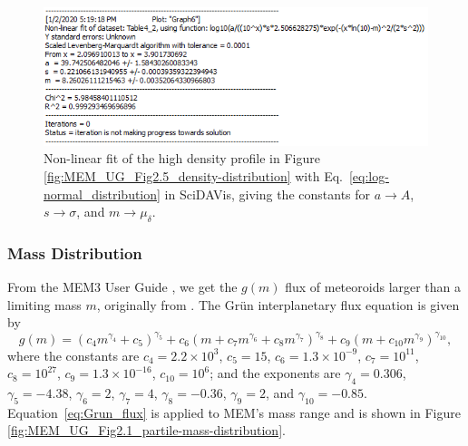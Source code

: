 \documentclass{article}
\begin{document}
\begin{figure}[!htb]
	\centering
	\includegraphics[scale=0.85]{Fit-to-MEM_high_dens.PNG}
	\caption{Non-linear fit of the high density profile in Figure \ref{fig:MEM_UG_Fig2.5_density-distribution} with Eq.\ \ref{eq:log-normal_distribution} in \textsf{SciDAVis}, giving the constants for $a\rightarrow A$, $s\rightarrow \sigma$, and $m\rightarrow \mu_\delta$.}\label{fig:Fit-to-MEM_high_dens}
\end{figure}
\clearpage

\subsubsection{Mass Distribution}


From the MEM3 User Guide , we get the $g(m)$ flux of meteoroids larger than a limiting mass $m$, originally from \cite{grun1985collisional}. The Gr{\"u}n interplanetary flux equation is given by
\begin{equation}\label{eq:Grun_flux}
g(m) = (c_4m^{\gamma_4}+c_5)^{\gamma_5} + c_6(m + c_7m^{\gamma_6} + c_8m^{\gamma_7})^{\gamma_8} + c_9(m + c_{10}m^{\gamma_9})^{\gamma_{10}},
\end{equation}
where the constants are $c_4 = 2.2\times 10^3$, $c_5 = 15$, $c_6 = 1.3 \times 10^{-9}$, $c_7=10^{11}$, $c_8=10^{27}$, $c_9 = 1.3\times 10^{-16}$, $c_{10} = 10^6$; and the exponents are $\gamma_4 = 0.306$, $\gamma_5 = -4.38$, $\gamma_6 = 2$, $\gamma_7 = 4$, $\gamma_8 = -0.36$, $\gamma_{9} = 2$, and $\gamma_{10} = -0.85$. Equation\ \ref{eq:Grun_flux} is applied to MEM's mass range and is shown in Figure \ref{fig:MEM_UG_Fig2.1_partile-mass-distribution}.
\end{document}
